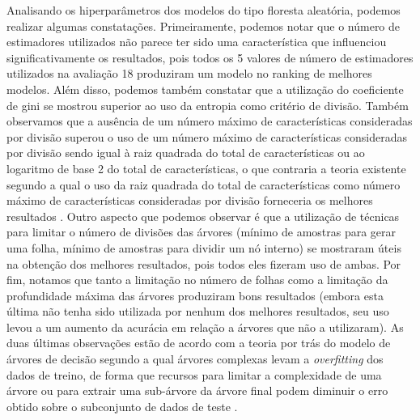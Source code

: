 Analisando os hiperparâmetros dos modelos do tipo floresta aleatória, podemos realizar algumas constatações. Primeiramente, podemos notar que o número de estimadores utilizados não parece ter sido uma característica que influenciou significativamente os resultados, pois todos os 5 valores de número de estimadores utilizados na avaliação 18 produziram um modelo no ranking de melhores modelos. Além disso, podemos também constatar que a utilização do coeficiente de gini se mostrou superior ao uso da entropia como critério de divisão. Também observamos que a ausência de um número máximo de características consideradas por divisão superou o uso de um número máximo de características consideradas por divisão sendo igual à raiz quadrada do total de características ou ao logaritmo de base 2 do total de características, o que contraria a teoria existente segundo a qual o uso da raiz quadrada do total de características como número máximo de características consideradas por divisão forneceria os melhores resultados \cite[p.319-321]{statistical_learning}. Outro aspecto que podemos observar é que a utilização de técnicas para limitar o número de divisões das árvores (mínimo de amostras para gerar uma folha, mínimo de amostras para dividir um nó interno) se mostraram úteis na obtenção dos melhores resultados, pois todos eles fizeram uso de ambas. Por fim, notamos que tanto a limitação no número de folhas como a limitação da profundidade máxima das árvores produziram bons resultados (embora esta última não tenha sido utilizada por nenhum dos melhores resultados, seu uso levou a um aumento da acurácia em relação a árvores que não a utilizaram). As duas últimas observações estão de acordo com a teoria por trás do modelo de árvores de decisão segundo a qual árvores complexas levam a \textit{overfitting} dos dados de treino, de forma que recursos para limitar a complexidade de uma árvore ou para extrair uma sub-árvore da árvore final podem diminuir o erro obtido sobre o subconjunto de dados de teste \cite[p.307-311]{statistical_learning}.

